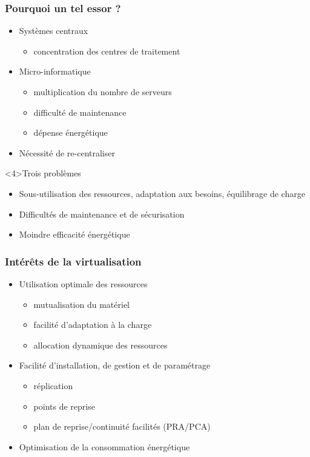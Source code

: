 \begin{frame}
\frametitle{Pourquoi un tel essor ?}
\begin{itemize}
\item <1->Systèmes centraux
\begin{itemize}
\item concentration des centres de traitement
\end{itemize}

\item <2->Micro-informatique
\begin{itemize}
\item multiplication du nombre de serveurs
\item difficulté de maintenance
\item dépense énergétique
\end{itemize}

\item <3->Nécessité de re-centraliser
\end{itemize}

\begin{block}<4>{Trois problèmes}
\begin{itemize}
\item Sous-utilisation des ressources, adaptation aux besoins, équilibrage de charge
\item Difficultés de maintenance et de sécurisation
\item Moindre efficacité énergétique
\end{itemize}
\end{block}
\end{frame}

\begin{frame}
\frametitle{Intérêts de la virtualisation}
\begin{itemize}
\item <1->Utilisation optimale des ressources
\begin{itemize}
\item mutualisation du matériel
\item facilité d'adaptation à la charge
\item allocation dynamique des ressources
\end{itemize}
\item <2->Facilité d'installation, de gestion et de paramétrage
\begin{itemize}
\item réplication
\item points de reprise
\item plan de reprise/continuité facilités (PRA/PCA)
\end{itemize}
\item <3->Optimisation de la consommation énergétique
\end{itemize}
\end{frame}

